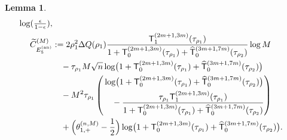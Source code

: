 \documentclass[a4paper]{article}
\newtheorem{lemma}[theorem]{Lemma}
\numberwithin{equation}{section}
\begin{document}
\begin{lemma}
\begin{align*}
\log(\tfrac{\epsilon}{1-\epsilon}),
\\
\widetilde{C}_{ E_5^{(\mathrm{an})}}^{(M)} 
&:=
2\rho_1^2\Delta Q(\rho_1)
\frac{\mathsf{T}_{1}^{(2m+1,3m)}(\tau_{\rho_1})}{1+\mathsf{T}_{0}^{(2m+1,3m)}(\tau_{\rho_1})+\widehat{\mathsf{T}}_{0}^{(3m+1,7m)}(\tau_{\rho_2})}
\log M
\\
&\quad
-\tau_{\rho_1}M\sqrt{n}\log\bigl(1+\mathsf{T}_{0}^{(2m+1,3m)}(\tau_{\rho_1})+\widehat{\mathsf{T}}_0^{(3m+1,7m)}(\tau_{\rho_2})\bigr)
\\
&\quad
-M^2\tau_{\rho_1}
\left(\begin{aligned}&
\log\bigl(1+\mathsf{T}_{0}^{(2m+1,3m)}(\tau_{\rho_1})+\widehat{\mathsf{T}}_0^{(3m+1,7m)}(\tau_{\rho_2})\bigr)
\\
&\quad-\frac{\tau_{\rho_1}\mathsf{T}_{1}^{(2m+1,3m)}(\tau_{\rho_1})}{1+\mathsf{T}_{0}^{(2m+1,3m)}(\tau_{\rho_1})+\widehat{\mathsf{T}}_0^{(3m+1,7m)}(\tau_{\rho_2})}
\end{aligned}\right)
\\
&\quad
+
\Bigl(\theta_{1,+}^{(n,M)}-\frac{1}{2}\Bigr)
\log\bigl(1+\mathsf{T}_{0}^{(2m+1,3m)}(\tau_{\rho_1})+\widehat{\mathsf{T}}_0^{(3m+1,7m)}(\tau_{\rho_2})\bigr). 
\end{align*}
\end{lemma}
\end{document}
